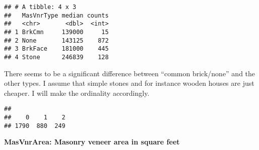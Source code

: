 \documentclass[]{article}
\newenvironment{Shaded}{\begin{snugshade}}{\end{snugshade}}
\newcommand{\DataTypeTok}[1]{\textcolor[rgb]{0.13,0.29,0.53}{#1}}
\newcommand{\DecValTok}[1]{\textcolor[rgb]{0.00,0.00,0.81}{#1}}
\newcommand{\KeywordTok}[1]{\textcolor[rgb]{0.13,0.29,0.53}{\textbf{#1}}}
\newcommand{\NormalTok}[1]{#1}
\newcommand{\OperatorTok}[1]{\textcolor[rgb]{0.81,0.36,0.00}{\textbf{#1}}}
\newcommand{\StringTok}[1]{\textcolor[rgb]{0.31,0.60,0.02}{#1}}
\begin{document}
\begin{Shaded}
\end{Shaded}

\begin{verbatim}
## # A tibble: 4 x 3
##   MasVnrType median counts
##   <chr>       <dbl>  <int>
## 1 BrkCmn     139000     15
## 2 None       143125    872
## 3 BrkFace    181000    445
## 4 Stone      246839    128
\end{verbatim}

There seems to be a significant difference between ``common brick/none''
and the other types. I assume that simple stones and for instance wooden
houses are just cheaper. I will make the ordinality accordingly.

\begin{Shaded}
\end{Shaded}

\begin{verbatim}
## 
##    0    1    2 
## 1790  880  249
\end{verbatim}

\textbf{MasVnrArea: Masonry veneer area in square feet}
\end{document}
